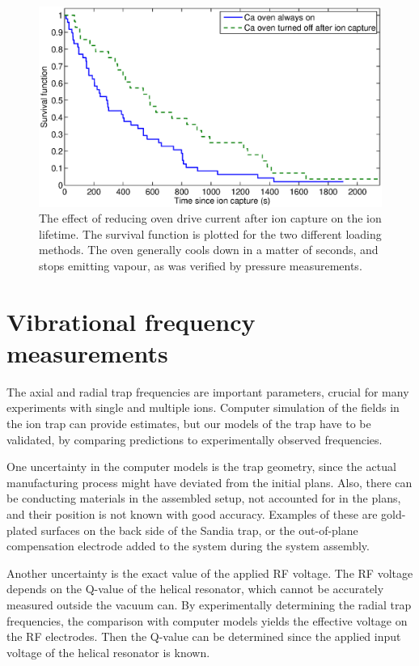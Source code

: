 \begin{figure}[h!t]
\centering
\includegraphics[width=14.5cm]{chapter6/lifetime/lifetime_oven}
\caption[Effect of turning off \CaI{} oven on ion lifetime]{The effect of reducing \CaI{} oven drive current after ion capture on the ion lifetime. The survival function is plotted for the two different loading methods. The \CaI{} oven generally cools down in a matter of seconds, and stops emitting \CaI{} vapour, as was verified by pressure measurements. \cversion}
\label{fig:lifetimeplot_ovens}
\end{figure} 



\section{Vibrational frequency measurements}
\label{sec:ticleexperiment}

The axial and radial trap frequencies are important parameters, crucial for many experiments with single and multiple ions. Computer simulation of the fields in the ion trap can provide estimates, but our models of the trap have to be validated, by comparing predictions to experimentally observed frequencies.

One uncertainty in the computer models is the trap geometry, since the actual manufacturing process might have deviated from the initial plans. Also, there can be conducting materials in the assembled setup, not accounted for in the plans, and their position is not known with good accuracy. Examples of these are gold-plated surfaces on the back side of the Sandia trap, or the out-of-plane compensation electrode added to the system during the system assembly.


Another uncertainty is the exact value of the applied RF voltage. The RF voltage depends on the Q-value of the helical resonator, which cannot be accurately measured outside the vacuum can. By experimentally determining the radial trap frequencies, the comparison with computer models yields the effective voltage on the RF electrodes. Then the Q-value can be determined since the applied input voltage of the helical resonator is known. 

